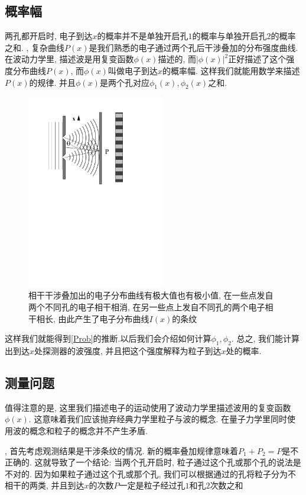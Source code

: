 \documentclass[a4paper,11pt]{book}
\begin{document}
\subsection{概率幅}
两孔都开启时, 电子到达$x$的概率并不是单独开启孔$1$的概率与单独开启孔$2$的概率之和.
, 复杂曲线$P(x)$是我们熟悉的电子通过两个孔后干涉叠加的分布强度曲线. 在波动力学里, 描述波是用复变函数$\phi(x)$描述的, 而$|\phi(x)|^2$正好描述了这个强度分布曲线$P(x)$, 而$\phi(x)$叫做电子到达$x$的概率幅. 这样我们就能用数学来描述$P(x)$的规律. 并且$\phi(x)$是两个孔对应$\phi_1(x),\phi_2(x)$之和.
\begin{figure}[H]
  \centering
  \includegraphics[width=6cm]{fig5.pdf}
  \caption{相干干涉叠加出的电子分布曲线有极大值也有极小值, 在一些点发自两个不同孔的电子相干相消, 在另一些点上发自不同孔的两个电子相干相长, 由此产生了电子分布曲线$I(x)$的条纹}\label{double slit 2}
\end{figure}
这样我们就能得到\ref{Prob}的推断.以后我们会介绍如何计算$\phi_1,\phi_2$. 总之, 我们能计算出到达$x$处探测器的波强度, 并且把这个强度解释为粒子到达$x$处的概率.
\subsection{测量问题}
值得注意的是, 这里我们描述电子的运动使用了波动力学里描述波用的复变函数$\phi(x)$. 这意味着我们应该抛弃经典力学里粒子与波的概念. 在量子力学里同时使用波的概念和粒子的概念并不产生矛盾.

, 首先考虑观测结果是干涉条纹的情况. 新的概率叠加规律意味着$P_1+P_2=P$是不正确的. 这就导致了一个结论: 当两个孔开启时, 粒子通过这个孔或那个孔的说法是不对的. 因为如果粒子通过这个孔或那个孔, 我们可以根据通过的孔将粒子分为不相干的两类, 并且到达$x$的次数$P$一定是粒子经过孔$1$和孔$2$次数之和
\end{document}
